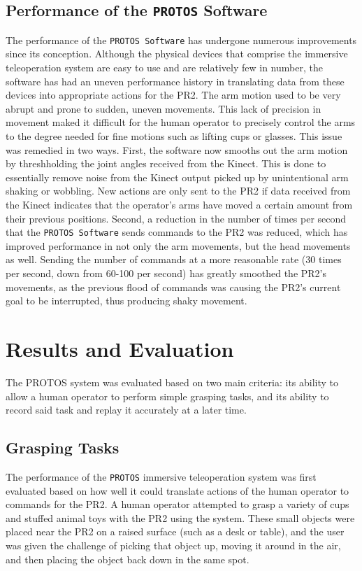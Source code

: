 \documentclass{sig-alternate}
\begin{document}
\subsection {Performance of the {\tt PROTOS} Software}
\indent The performance of the {\tt PROTOS Software} has undergone numerous improvements since its conception. 
Although the physical devices that comprise the immersive teleoperation system 
are easy to use and are relatively few in number, the software has had an uneven performance history in translating data from these devices 
into appropriate actions for the PR2. The arm motion used to be very abrupt and prone to sudden, uneven movements. This lack of 
precision in movement maked it difficult for the human operator to precisely control the arms to the degree needed for fine motions such as lifting cups or glasses. This
issue was remedied in two ways. First, the software now smooths out the arm motion by threshholding the joint angles received from the Kinect.
This is done to essentially remove noise from the Kinect output picked up by unintentional arm shaking or wobbling. New actions are only sent to the PR2 if data received 
from the Kinect indicates that the operator's arms have moved a certain amount from their previous positions. Second, a reduction in the number of times per second that the
{\tt PROTOS Software} sends commands to the PR2 was reduced, which has improved performance in not only the arm movements, but the head movements as well. Sending the 
number of commands at a more reasonable rate (30 times per second, down from 60-100 per second) has greatly smoothed the PR2's movements, as the previous flood of commands
was causing the PR2's current goal to be interrupted, thus producing shaky movement.

\section{Results and Evaluation}
\label{sec:results}
The PROTOS system was evaluated based on two main criteria: its ability to allow a human operator to perform simple grasping tasks, and its ability to record said task
and replay it accurately at a later time. 

\subsection{Grasping Tasks}
\indent The performance of the {\tt PROTOS} immersive teleoperation system was first
evaluated based on how well it could translate actions of
the human operator to commands for the PR2. A human operator attempted to grasp a variety of cups and stuffed animal toys 
with the PR2 using the system. These small objects were placed near the PR2 on a raised surface (such as a desk or table), and the user was given the challenge of
picking that object up, moving it around in the air, and then placing the object back down in the same spot.
\end{document}
